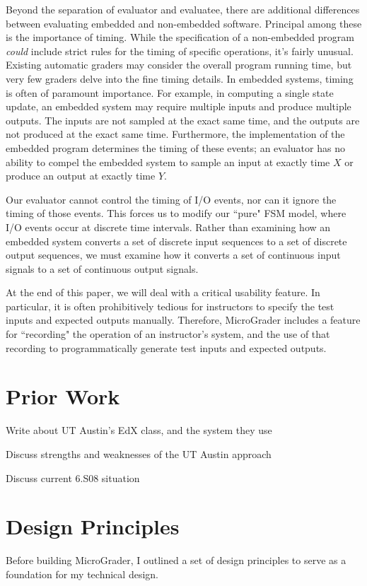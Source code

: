\documentclass[12pt]{article}
\begin{document}
Beyond the separation of evaluator and evaluatee, there are additional differences between evaluating embedded and non-embedded software.  Principal among these is the importance of timing.  While the specification of a non-embedded program \textit{could} include strict rules for the timing of specific operations, it's fairly unusual.  Existing automatic graders may consider the overall program running time, but very few graders delve into the fine timing details. In embedded systems, timing is often of paramount importance.  For example, in computing a single state update, an embedded system may require multiple inputs and produce multiple outputs.  The inputs are not sampled at the exact same time, and the outputs are not produced at the exact same time.  Furthermore, the implementation of the embedded program determines the timing of these events; an evaluator has no ability to compel the embedded system to sample an input at exactly time $X$ or produce an output at exactly time $Y$.

Our evaluator cannot control the timing of I/O events, nor can it ignore the timing of those events.  This forces us to modify our ``pure" FSM model, where I/O events occur at discrete time intervals.  Rather than examining how an embedded system converts a set of discrete input sequences to a set of discrete output sequences, we must examine how it converts a set of continuous input signals to a set of continuous output signals.

At the end of this paper, we will deal with a critical usability feature.  In particular, it is often prohibitively tedious for instructors to specify the test inputs and expected outputs manually.  Therefore, MicroGrader includes a feature for ``recording" the operation of an instructor's system, and the use of that recording to programmatically generate test inputs and expected outputs. 


\newpage
\section{Prior Work}
Write about UT Austin's EdX class, and the system they use

Discuss strengths and weaknesses of the UT Austin approach

Discuss current 6.S08 situation

\newpage
\section{Design Principles}
Before building MicroGrader, I outlined a set of design principles to serve as a foundation for my technical design.
\end{document}
